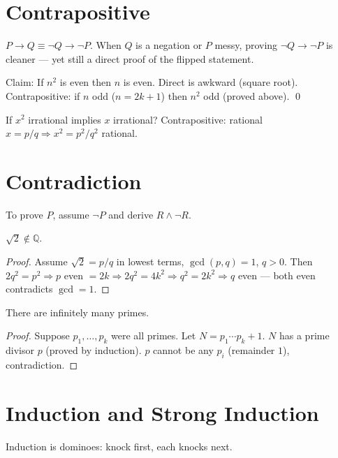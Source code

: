 \section{Contrapositive}
\label{sec:contrapositive}
$P\to Q\equiv\neg Q\to\neg P$. When $Q$ is a negation or $P$ messy, proving $\neg Q\to\neg P$ is cleaner --- yet still a direct proof of the flipped statement.

\begin{example}
Claim: If $n^2$ is even then $n$ is even. Direct is awkward (square root). Contrapositive: if $n$ odd ($n=2k+1$) then $n^2$ odd (proved above). \qed
\end{example}

\begin{lemma}
If $x^2$ irrational implies $x$ irrational? Contrapositive: rational $x=p/q\Rightarrow x^2=p^2/q^2$ rational.
\end{lemma}

\section{Contradiction}
\label{sec:contradiction}
To prove $P$, assume $\neg P$ and derive $R\land\neg R$.

\begin{theorem}
$\sqrt2\notin\mathbb{Q}$.
\end{theorem}
\begin{proof} Assume $\sqrt2=p/q$ in lowest terms, $\gcd(p,q)=1$, $q>0$. Then $2q^2=p^2\Rightarrow p$ even $=2k\Rightarrow 2q^2=4k^2\Rightarrow q^2=2k^2\Rightarrow q$ even --- both even contradicts $\gcd=1$.
\end{proof}

\begin{theorem}
There are infinitely many primes.
\end{theorem}
\begin{proof} Suppose $p_1,\dots,p_k$ were all primes. Let $N=p_1\cdots p_k+1$. $N$ has a prime divisor $p$ (proved by induction). $p$ cannot be any $p_i$ (remainder $1$), contradiction.
\end{proof}

\section{Induction and Strong Induction}
\label{sec:induction}
Induction is dominoes: knock first, each knocks next.

